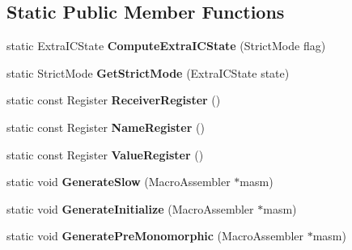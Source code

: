 \subsection*{Static Public Member Functions}
\begin{DoxyCompactItemize}
\item 
\hypertarget{classv8_1_1internal_1_1_store_i_c_ac1b0d724d12f02732bd2fc5e229728ed}{}static Extra\+I\+C\+State {\bfseries Compute\+Extra\+I\+C\+State} (Strict\+Mode flag)\label{classv8_1_1internal_1_1_store_i_c_ac1b0d724d12f02732bd2fc5e229728ed}

\item 
\hypertarget{classv8_1_1internal_1_1_store_i_c_a753e3f4dea2820afc3addefe8e64ccb4}{}static Strict\+Mode {\bfseries Get\+Strict\+Mode} (Extra\+I\+C\+State state)\label{classv8_1_1internal_1_1_store_i_c_a753e3f4dea2820afc3addefe8e64ccb4}

\item 
\hypertarget{classv8_1_1internal_1_1_store_i_c_a7ced912601307288fd49ad20a1491e67}{}static const Register {\bfseries Receiver\+Register} ()\label{classv8_1_1internal_1_1_store_i_c_a7ced912601307288fd49ad20a1491e67}

\item 
\hypertarget{classv8_1_1internal_1_1_store_i_c_a1fd40174c01944b380ac652f2c0d8a52}{}static const Register {\bfseries Name\+Register} ()\label{classv8_1_1internal_1_1_store_i_c_a1fd40174c01944b380ac652f2c0d8a52}

\item 
\hypertarget{classv8_1_1internal_1_1_store_i_c_a413b427173eb2aee43980d032f6ba35b}{}static const Register {\bfseries Value\+Register} ()\label{classv8_1_1internal_1_1_store_i_c_a413b427173eb2aee43980d032f6ba35b}

\item 
\hypertarget{classv8_1_1internal_1_1_store_i_c_af95f39504c8dabaf02136fa77269fbb9}{}static void {\bfseries Generate\+Slow} (Macro\+Assembler $\ast$masm)\label{classv8_1_1internal_1_1_store_i_c_af95f39504c8dabaf02136fa77269fbb9}

\item 
\hypertarget{classv8_1_1internal_1_1_store_i_c_a5c10e43b62a3f5bdbfe72e77d463c083}{}static void {\bfseries Generate\+Initialize} (Macro\+Assembler $\ast$masm)\label{classv8_1_1internal_1_1_store_i_c_a5c10e43b62a3f5bdbfe72e77d463c083}

\item 
\hypertarget{classv8_1_1internal_1_1_store_i_c_a13be6757b22381a6731c62013653185c}{}static void {\bfseries Generate\+Pre\+Monomorphic} (Macro\+Assembler $\ast$masm)\label{classv8_1_1internal_1_1_store_i_c_a13be6757b22381a6731c62013653185c}


\end{DoxyCompactItemize}
